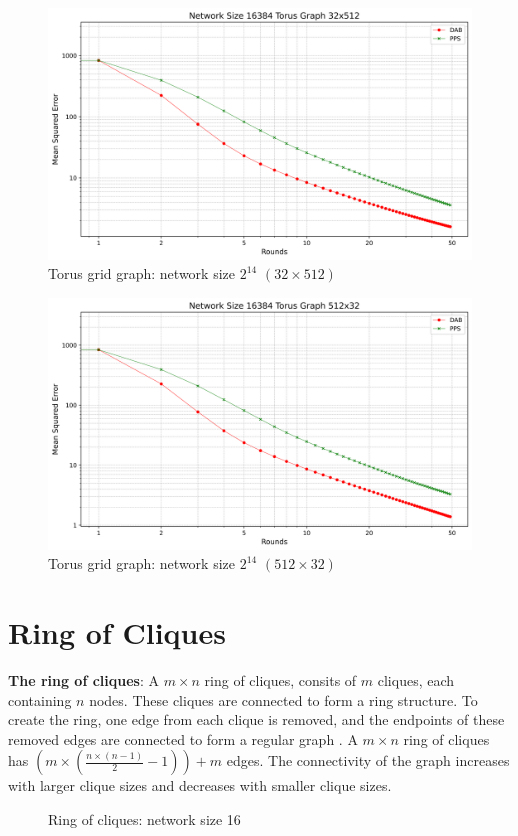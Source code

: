 \begin{figure}[H]
    \centering
    \includegraphics[scale=0.5]{figures/torusGridGraphSimulations/32x512/DAB_vs_PPS_TG_r50_n16384.png}
    \caption{Torus grid graph: network size $2^{14}$ $(32\times512)$}
    \label{fig:32x512torusGraph}
\end{figure}

\begin{figure}[H]
    \centering
    \includegraphics[scale=0.5]{figures/torusGridGraphSimulations/512x32/DAB_vs_PPS_TG_r50_n16384.png}
    \caption{Torus grid graph: network size $2^{14}$ $(512\times32)$}
    \label{fig:512x32torusGraph}
\end{figure}

\section{Ring of Cliques}
\textbf{The ring of cliques}: A $m \times n$ ring of cliques, consits of $m$ cliques, each containing $n$ nodes. These cliques are connected to form a ring structure. To create the ring, one edge from each clique is removed, and the endpoints of these removed edges are connected to form a regular graph \cite{Mahlmann2010}.  A $m \times n$ ring of cliques has $\left( m\times \left(\frac{n\times (n - 1)}{2}-1 \right) \right) +m$ edges. The connectivity of the graph increases with larger clique sizes and decreases with smaller clique sizes.
\begin{figure}[H]
    \centering
    \scalebox{1}{}
    \caption{Ring of cliques: network size 16}
    \label{fig:ringofcliquesDemo}
\end{figure}

